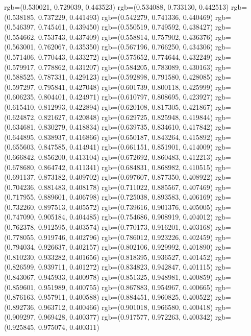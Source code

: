 {{{					rgb=(0.530021, 0.729039, 0.443523)
					rgb=(0.534088, 0.733130, 0.442513)
					rgb=(0.538185, 0.737229, 0.441493)
					rgb=(0.542279, 0.741336, 0.440469)
					rgb=(0.546397, 0.745461, 0.439450)
					rgb=(0.550519, 0.749592, 0.438427)
					rgb=(0.554662, 0.753743, 0.437409)
					rgb=(0.558814, 0.757902, 0.436376)
					rgb=(0.563001, 0.762067, 0.435350)
					rgb=(0.567196, 0.766250, 0.434306)
					rgb=(0.571406, 0.770443, 0.433272)
					rgb=(0.575652, 0.774644, 0.432249)
					rgb=(0.579917, 0.778862, 0.431207)
					rgb=(0.584205, 0.783089, 0.430163)
					rgb=(0.588525, 0.787331, 0.429123)
					rgb=(0.592898, 0.791580, 0.428085)
					rgb=(0.597297, 0.795841, 0.427048)
					rgb=(0.601739, 0.800118, 0.425999)
					rgb=(0.606235, 0.804401, 0.424971)
					rgb=(0.610797, 0.808695, 0.423927)
					rgb=(0.615410, 0.812993, 0.422894)
					rgb=(0.620108, 0.817305, 0.421867)
					rgb=(0.624872, 0.821627, 0.420848)
					rgb=(0.629725, 0.825948, 0.419844)
					rgb=(0.634681, 0.830279, 0.418834)
					rgb=(0.639735, 0.834610, 0.417842)
					rgb=(0.644895, 0.838937, 0.416866)
					rgb=(0.650187, 0.843264, 0.415892)
					rgb=(0.655603, 0.847585, 0.414941)
					rgb=(0.661151, 0.851901, 0.414009)
					rgb=(0.666842, 0.856200, 0.413104)
					rgb=(0.672692, 0.860483, 0.412213)
					rgb=(0.678680, 0.864742, 0.411341)
					rgb=(0.684831, 0.868982, 0.410515)
					rgb=(0.691137, 0.873182, 0.409702)
					rgb=(0.697607, 0.877350, 0.408922)
					rgb=(0.704236, 0.881483, 0.408178)
					rgb=(0.711022, 0.885567, 0.407469)
					rgb=(0.717955, 0.889601, 0.406798)
					rgb=(0.725038, 0.893583, 0.406169)
					rgb=(0.732260, 0.897513, 0.405572)
					rgb=(0.739616, 0.901376, 0.405005)
					rgb=(0.747090, 0.905184, 0.404485)
					rgb=(0.754686, 0.908919, 0.404012)
					rgb=(0.762378, 0.912595, 0.403574)
					rgb=(0.770173, 0.916201, 0.403168)
					rgb=(0.778055, 0.919746, 0.402796)
					rgb=(0.786012, 0.923226, 0.402459)
					rgb=(0.794034, 0.926637, 0.402157)
					rgb=(0.802106, 0.929992, 0.401890)
					rgb=(0.810230, 0.933282, 0.401656)
					rgb=(0.818395, 0.936527, 0.401452)
					rgb=(0.826599, 0.939711, 0.401272)
					rgb=(0.834823, 0.942847, 0.401115)
					rgb=(0.843067, 0.945933, 0.400978)
					rgb=(0.851325, 0.948981, 0.400859)
					rgb=(0.859601, 0.951989, 0.400755)
					rgb=(0.867883, 0.954967, 0.400665)
					rgb=(0.876163, 0.957911, 0.400588)
					rgb=(0.884451, 0.960825, 0.400522)
					rgb=(0.892736, 0.963712, 0.400466)
					rgb=(0.901018, 0.966580, 0.400418)
					rgb=(0.909297, 0.969428, 0.400377)
					rgb=(0.917577, 0.972263, 0.400342)
					rgb=(0.925845, 0.975074, 0.400311)
}}}
